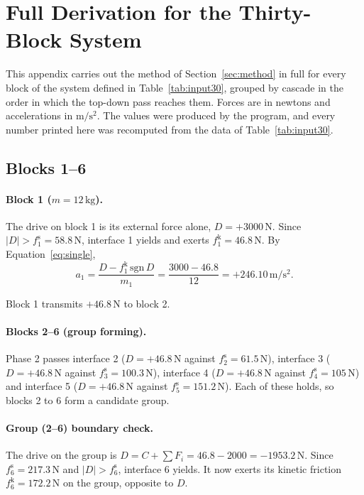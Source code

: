 \documentclass[11pt,a4paper]{article}
\begin{document}
\appendix

\section{Full Derivation for the Thirty-Block System}\label{app:derivation}

This appendix carries out the method of Section~\ref{sec:method} in full for every block of the system defined in Table~\ref{tab:input30}, grouped by cascade in the order in which the top-down pass reaches them. Forces are in newtons and accelerations in $\mathrm{m/s^2}$. The values were produced by the program, and every number printed here was recomputed from the data of Table~\ref{tab:input30}.

\subsection{Blocks 1--6}
\paragraph{Block 1 ($m=12\,\mathrm{kg}$).} The drive on block 1 is its external force alone, $D=+3000\,\mathrm{N}$. Since $|D|>f^{\mathrm s}_{1}=58.8\,\mathrm{N}$, interface 1 yields and exerts $f^{\mathrm k}_{1}=46.8\,\mathrm{N}$. By Equation~\eqref{eq:single},\[a_{1}=\dfrac{D-f^{\mathrm k}_{1}\,\mathrm{sgn}\,D}{m_{1}}=\dfrac{3000 - 46.8}{12}=+246.10\,\mathrm{m/s^2}.\]

Block 1 transmits $+46.8\,\mathrm{N}$ to block 2.

\paragraph{Blocks 2--6 (group forming).} Phase 2 passes interface 2 ($D=+46.8\,\mathrm{N}$ against $f^{\mathrm s}_{2}=61.5\,\mathrm{N}$), interface 3 ($D=+46.8\,\mathrm{N}$ against $f^{\mathrm s}_{3}=100.3\,\mathrm{N}$), interface 4 ($D=+46.8\,\mathrm{N}$ against $f^{\mathrm s}_{4}=105\,\mathrm{N}$) and interface 5 ($D=+46.8\,\mathrm{N}$ against $f^{\mathrm s}_{5}=151.2\,\mathrm{N}$). Each of these holds, so blocks 2 to 6 form a candidate group.

\paragraph{Group (2--6) boundary check.} The drive on the group is $D=C+\sum F_i=46.8 - 2000=-1953.2\,\mathrm{N}$. Since $f^{\mathrm s}_{6}=217.3\,\mathrm{N}$ and $|D|>f^{\mathrm s}_{6}$, interface 6 yields. It now exerts its kinetic friction $f^{\mathrm k}_{6}=172.2\,\mathrm{N}$ on the group, opposite to $D$.
\end{document}
